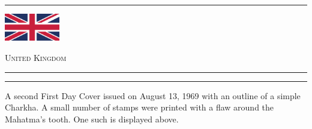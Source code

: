 \documentclass[a4paper]{article}
\begin{document}
\hrule
\vspace{8pt}
\begin{minipage}{2cm}
  \includegraphics[height=1.2cm]{images/gb}
\end{minipage}
\hfill
{\scshape\huge United Kingdom}
\vspace{8pt}
\hrule
\vspace{17cm}
\begin{center}
  \begin{minipage}{10cm}
    \hrule \vspace{12pt} A second First Day Cover issued on August 13,
    1969 with an outline of a simple Charkha. A small number of stamps
    were printed with a flaw around the Mahatma's tooth. One such is
    displayed above.
  \end{minipage}
\end{center}
\end{document}
